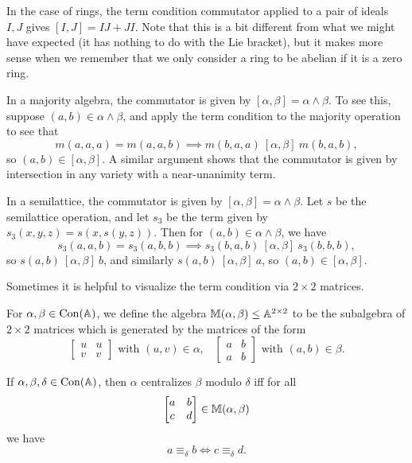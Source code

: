 \documentclass[letterpaper,11pt]{article}
\DeclareMathOperator{\Con}{Con}
\begin{document}
\begin{ex} In the case of rings, the term condition commutator applied to a pair of ideals $I,J$ gives $[I,J] = IJ + JI$. Note that this is a bit different from what we might have expected (it has nothing to do with the Lie bracket), but it makes more sense when we remember that we only consider a ring to be abelian if it is a zero ring.
\end{ex}

\begin{ex} In a majority algebra, the commutator is given by $[\alpha,\beta] = \alpha \wedge \beta$. To see this, suppose $(a,b) \in \alpha \wedge \beta$, and apply the term condition to the majority operation to see that
\[
m(\boxed{a},a,a) = m(\boxed{a},a,b) \implies m(\boxed{b},a,a)\ [\alpha,\beta]\ m(\boxed{b},a,b),
\]
so $(a,b) \in [\alpha,\beta]$. A similar argument shows that the commutator is given by intersection in any variety with a near-unanimity term.
\end{ex}

\begin{ex}\label{semi-sd-meet} In a semilattice, the commutator is given by $[\alpha,\beta] = \alpha\wedge\beta$. Let $s$ be the semilattice operation, and let $s_3$ be the term given by $s_3(x,y,z) = s(x,s(y,z))$. Then for $(a,b) \in \alpha\wedge\beta$, we have
\[
s_3(\boxed{a},a,b) = s_3(\boxed{a},b,b) \implies s_3(\boxed{b},a,b)\ [\alpha,\beta]\ s_3(\boxed{b},b,b),
\]
so $s(a,b)\ [\alpha,\beta]\ b$, and similarly $s(a,b)\ [\alpha,\beta]\ a$, so $(a,b) \in [\alpha,\beta]$.
\end{ex}

Sometimes it is helpful to visualize the term condition via $2\times 2$ matrices.

\begin{defn}\label{commutator-matrix} For $\alpha, \beta \in \Con(\bA)$, we define the algebra $\mathbb{M}(\alpha,\beta) \le \mathbb{A}^{2\times 2}$ to be the subalgebra of $2\times 2$ matrices which is generated by the matrices of the form
\[
\begin{bmatrix} u & u\\ v & v\end{bmatrix} \text{ with } (u,v) \in \alpha, \;\;\; \begin{bmatrix} a & b\\ a & b\end{bmatrix} \text{ with } (a,b) \in \beta.
\]
\end{defn}

\begin{prop} If $\alpha, \beta, \delta \in \Con(\bA)$, then $\alpha$ centralizes $\beta$ modulo $\delta$ iff for all
\[
\begin{bmatrix} a & b\\ c & d\end{bmatrix} \in \mathbb{M}(\alpha,\beta)
\]
we have
\[
a \equiv_\delta b \iff c \equiv_\delta d.
\]
\end{prop}
\end{document}
